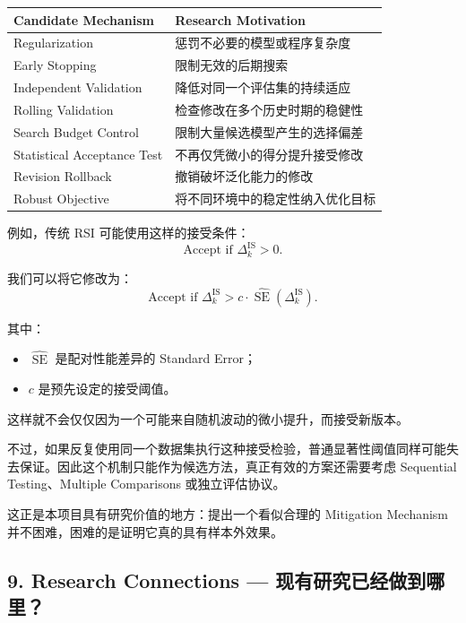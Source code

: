 \begin{readertable}
\begin{longtable}[]{@{}
  >{\raggedright\arraybackslash}p{}
  >{\raggedright\arraybackslash}p{}@{}}
\toprule
Candidate Mechanism & Research Motivation \\
\midrule
\endhead
Regularization & 惩罚不必要的模型或程序复杂度 \\
Early Stopping & 限制无效的后期搜索 \\
Independent Validation & 降低对同一个评估集的持续适应 \\
Rolling Validation & 检查修改在多个历史时期的稳健性 \\
Search Budget Control & 限制大量候选模型产生的选择偏差 \\
Statistical Acceptance Test & 不再仅凭微小的得分提升接受修改 \\
Revision Rollback & 撤销破坏泛化能力的修改 \\
Robust Objective & 将不同环境中的稳定性纳入优化目标 \\
\bottomrule
\end{longtable}
\end{readertable}

例如，传统 RSI 可能使用这样的接受条件：
\[\text{Accept if }
\Delta_k^{\mathrm{IS}}>0.\]

我们可以将它修改为：
\[\text{Accept if }
\Delta_k^{\mathrm{IS}}
>
c\cdot
\widehat{\operatorname{SE}}
(\Delta_k^{\mathrm{IS}}).\]

其中：

\begin{itemize}
\tightlist
\item
  \(\widehat{\operatorname{SE}}\) 是配对性能差异的 Standard Error；
\item
  \(c\) 是预先设定的接受阈值。
\end{itemize}

这样就不会仅仅因为一个可能来自随机波动的微小提升，而接受新版本。

不过，如果反复使用同一个数据集执行这种接受检验，普通显著性阈值同样可能失去保证。因此这个机制只能作为候选方法，真正有效的方案还需要考虑 Sequential Testing、Multiple Comparisons 或独立评估协议。

这正是本项目具有研究价值的地方：提出一个看似合理的 Mitigation Mechanism 并不困难，困难的是证明它真的具有样本外效果。

\hypertarget{part-1-07-0001-research-connections-ux73b0ux6709ux7814ux7a76ux5df2ux7ecfux505aux5230ux54eaux91cc}{%
\subsection{9. Research Connections --- 现有研究已经做到哪里？}\label{part-1-07-0001-research-connections-ux73b0ux6709ux7814ux7a76ux5df2ux7ecfux505aux5230ux54eaux91cc}}


